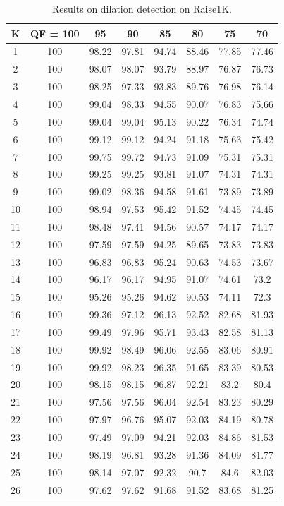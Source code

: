 \documentclass[review]{elsarticle}
\begin{document}
	\begin{longtable}{c|ccccccc}
		\caption{Results on dilation detection on Raise1K.}
		\label{table:raisedilation}\\	
		\hline\hline
		\textbf{K}&\textbf{QF = 100}&\textbf{95}&\textbf{90}&\textbf{85}&\textbf{80}&\textbf{75}&\textbf{70}\\
		\hline
		1&100&98.22&97.81&94.74&88.46&77.85&77.46\\
		2&100&98.07&98.07&93.79&88.97&76.87&76.73\\
		3&100&98.25&97.33&93.83&89.76&76.98&76.14\\
		4&100&99.04&98.33&94.55&90.07&76.83&75.66\\
		5&100&99.04&99.04&95.13&90.22&76.34&74.74\\
		6&100&99.12&99.12&94.24&91.18&75.63&75.42\\
		7&100&99.75&99.72&94.73&91.09&75.31&75.31\\
		8&100&99.25&99.25&93.81&91.07&74.31&74.31\\
		9&100&99.02&98.36&94.58&91.61&73.89&73.89\\
		10&100&98.94&97.53&95.42&91.52&74.45&74.45\\
		11&100&98.48&97.41&94.56&90.57&74.17&74.17\\
		12&100&97.59&97.59&94.25&89.65&73.83&73.83\\
		13&100&96.83&96.83&95.24&90.63&74.53&73.67\\
		14&100&96.17&96.17&94.95&91.07&74.61&73.2\\
		15&100&95.26&95.26&94.62&90.53&74.11&72.3\\
		16&100&99.36&97.12&96.13&92.52&82.68&81.93\\
		17&100&99.49&97.96&95.71&93.43&82.58&81.13\\
		18&100&99.92&98.49&96.06&92.55&83.06&80.91\\
		19&100&99.92&98.23&96.35&91.65&83.39&80.53\\
		20&100&98.15&98.15&96.87&92.21&83.2&80.4\\
		21&100&97.56&97.56&96.04&92.54&83.23&80.29\\
		22&100&97.97&96.76&95.07&92.03&84.19&80.78\\
		23&100&97.49&97.09&94.21&92.03&84.86&81.53\\
		24&100&98.19&96.81&93.28&91.36&84.09&81.77\\
		25&100&98.14&97.07&92.32&90.7&84.6&82.03\\
		26&100&97.62&97.62&91.68&91.52&83.68&81.25\\

\end{longtable}
\end{document}
